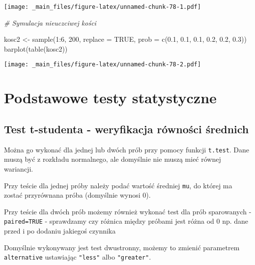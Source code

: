\documentclass[
]{book}
\newenvironment{Shaded}{\begin{snugshade}}{\end{snugshade}}
\newcommand{\AttributeTok}[1]{\textcolor[rgb]{0.77,0.63,0.00}{#1}}
\newcommand{\CommentTok}[1]{\textcolor[rgb]{0.56,0.35,0.01}{\textit{#1}}}
\newcommand{\ConstantTok}[1]{\textcolor[rgb]{0.00,0.00,0.00}{#1}}
\newcommand{\DecValTok}[1]{\textcolor[rgb]{0.00,0.00,0.81}{#1}}
\newcommand{\FloatTok}[1]{\textcolor[rgb]{0.00,0.00,0.81}{#1}}
\newcommand{\FunctionTok}[1]{\textcolor[rgb]{0.00,0.00,0.00}{#1}}
\newcommand{\NormalTok}[1]{#1}
\newcommand{\OtherTok}[1]{\textcolor[rgb]{0.56,0.35,0.01}{#1}}
\newcommand{\SpecialCharTok}[1]{\textcolor[rgb]{0.00,0.00,0.00}{#1}}
\begin{document}
\texttt{[image: \_main\_files/figure-latex/unnamed-chunk-78-1.pdf]}

\begin{Shaded}
\begin{Highlighting}[]
\CommentTok{\# Symulacja nieuczciwej kości}

\NormalTok{kosc2 }\OtherTok{\textless{}{-}} \FunctionTok{sample}\NormalTok{(}\DecValTok{1}\SpecialCharTok{:}\DecValTok{6}\NormalTok{, }\DecValTok{200}\NormalTok{, }\AttributeTok{replace =} \ConstantTok{TRUE}\NormalTok{, }\AttributeTok{prob =} \FunctionTok{c}\NormalTok{(}\FloatTok{0.1}\NormalTok{, }\FloatTok{0.1}\NormalTok{, }\FloatTok{0.1}\NormalTok{, }\FloatTok{0.2}\NormalTok{, }\FloatTok{0.2}\NormalTok{, }\FloatTok{0.3}\NormalTok{))}
\FunctionTok{barplot}\NormalTok{(}\FunctionTok{table}\NormalTok{(kosc2))}
\end{Highlighting}
\end{Shaded}

\texttt{[image: \_main\_files/figure-latex/unnamed-chunk-78-2.pdf]}

\hypertarget{podstawowe-testy-statystyczne}{%
\section{Podstawowe testy statystyczne}\label{podstawowe-testy-statystyczne}}

\hypertarget{test-t-studenta---weryfikacja-ruxf3wnoux15bci-ux15brednich}{%
\subsection{Test t-studenta - weryfikacja równości średnich}\label{test-t-studenta---weryfikacja-ruxf3wnoux15bci-ux15brednich}}

Można go wykonać dla jednej lub dwóch prób przy pomocy funkcji \texttt{t.test}. Dane muszą być z rozkładu normalnego, ale domyślnie nie muszą mieć równej wariancji.

Przy teście dla jednej próby należy podać wartość średniej \texttt{mu}, do której ma zostać przyrównana próba (domyślnie wynosi 0).

Przy teście dla dwóch prób możemy również wykonać test dla prób sparowanych - \texttt{paired=TRUE} - sprawdzamy czy różnica między próbami jest różna od 0 np. dane przed i po dodaniu jakiegoś czynnika

Domyślnie wykonywany jest test dwustronny, możemy to zmienić parametrem \texttt{alternative} ustawiając \texttt{"less"} albo \texttt{"greater"}.
\end{document}
